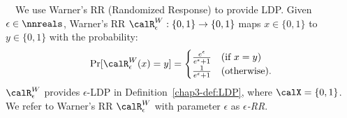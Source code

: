 \smallskip
{}~~We use Warner's RR (Randomized Response) \cite{Warner_JASA65} to provide 
LDP. 
Given $\epsilon \in \nnreals$, Warner's RR $\calR_{\epsilon}^W: \{0,1\} \rightarrow \{0,1\}$ maps $x \in \{0,1\}$ to $y \in \{0,1\}$ with the probability: 
\begin{align*}
    \Pr[\calR_{\epsilon}^W(x) = y] = 
    \begin{cases}
    \frac{e^\epsilon}{e^\epsilon + 1}   &   \text{(if $x=y$)} \\
    \frac{1}{e^\epsilon + 1}   &   \text{(otherwise)}.
    \end{cases}
\end{align*}
$\calR_{\epsilon}^W$ 
provides $\epsilon$-LDP in Definition~\ref{chap3-def:LDP}, where $\calX = \{0,1\}$. 
We refer to Warner's RR $\calR_{\epsilon}^W$ with parameter $\epsilon$ as \textit{$\epsilon$-RR}. 


